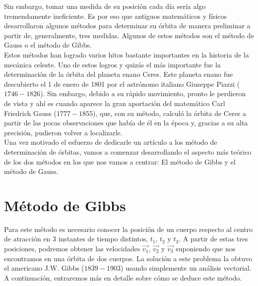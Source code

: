 \documentclass{article}
\numberwithin{equation}{section}
\begin{document}
Sin embargo, tomar una medida de su posición cada día sería 
algo tremendamente ineficiente. Es por eso que antiguos 
matemáticos y físicos desarrollaron algunos métodos para 
determinar su órbita de manera preliminar a partir de, generalmente, 
tres medidas. Algunos de estos métodos son el método de 
Gauss o el método de Gibbs. \\

Estos métodos han logrado varios hitos bastante importantes 
en la historia de la mecánica celeste. Uno de estos logros 
y quizás el más importante fue la determinación de la órbita 
del planeta enano Ceres. Este planeta enano fue descubierto 
el 1 de enero de 1801 por el astrónomo italiano Giuseppe Piazzi ($1746-1826$). 
Sin embargo, debido a su rápido movimiento, pronto le perdieron 
de vista y ahí es cuando aparece la gran aportación del matemático Carl Friedrich Gauss ($1777-1855$), 
que, con su método, calculó la órbita de Ceres a partir de 
las pocas observaciones que había de él en la época y, gracias 
a su alta precisión, pudieron volver a localizarle. \\

Una vez motivado el esfuerzo de dedicarle un artículo a los 
método de determinación de órbitas, vamos a comenzar desarrollando 
el aspecto más teórico de los dos métodos en los que nos 
vamos a centrar: El método de Gibbs y el método de Gauss.
\section{Método de Gibbs}
Para este método es necesario conocer la posición de un cuerpo 
respecto al centro de atracción en 3 instantes de tiempo distintos, 
$t_{1}$, $t_{2}$ y $t_{3}$. A partir de estas tres posiciones, 
podremos obtener las velocidades $\overrightarrow{v_{1}}$, 
$\overrightarrow{v_{2}}$ y $\overrightarrow{v_{3}}$ suponiendo 
que nos encontramos en una órbita de dos cuerpos. La solución a 
este problema la obtuvo el americano J.W. Gibbs ($1839-1903$) 
usando simplemente un análisis vectorial. A continuación, 
entraremos más en detalle sobre cómo se deduce este método.
\end{document}
